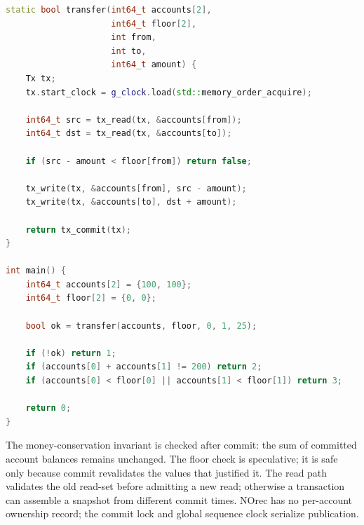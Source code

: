 \begin{lstlisting}[language=C++, caption={A compilable C++17 NOrec-style bank transfer with value revalidation.}]
static bool transfer(int64_t accounts[2],
                     int64_t floor[2],
                     int from,
                     int to,
                     int64_t amount) {
    Tx tx;
    tx.start_clock = g_clock.load(std::memory_order_acquire);

    int64_t src = tx_read(tx, &accounts[from]);
    int64_t dst = tx_read(tx, &accounts[to]);

    if (src - amount < floor[from]) return false;

    tx_write(tx, &accounts[from], src - amount);
    tx_write(tx, &accounts[to], dst + amount);

    return tx_commit(tx);
}

int main() {
    int64_t accounts[2] = {100, 100};
    int64_t floor[2] = {0, 0};

    bool ok = transfer(accounts, floor, 0, 1, 25);

    if (!ok) return 1;
    if (accounts[0] + accounts[1] != 200) return 2;
    if (accounts[0] < floor[0] || accounts[1] < floor[1]) return 3;

    return 0;
}
\end{lstlisting}

The money-conservation invariant is checked after commit: the sum of committed account balances remains unchanged. The floor check is speculative; it is safe only because commit revalidates the values that justified it. The read path validates the old read-set before admitting a new read; otherwise a transaction can assemble a snapshot from different commit times. NOrec has no per-account ownership record; the commit lock and global sequence clock serialize publication.

